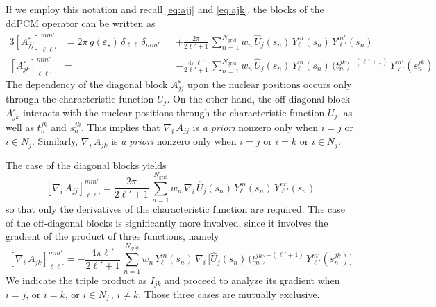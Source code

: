 \documentclass[aip,jcp,a4paper,11pt]{revtex4-1}
\newcommand{\nablai}{\nabla_{\!i}\,}
\begin{document}
If we employ this notation and recall \eqref{eq:ajj} and \eqref{eq:ajk}, the blocks of the ddPCM operator can be written as
\begin{alignat*}{3}
{[A_{jj}^\varepsilon]}_{\ell \ell'}^{mm'}& = 2\pi \, g(\varepsilon_s) \, \delta_{\ell \ell'} \delta_{m m'}&& + \frac{2\pi}{2 \ell' + 1} \,\sum_{n= 1}^{N_\text{grid}} w_n \, \hat{U}_j(s_n)  \,Y_\ell^m(s_n) \,  Y_{\ell'}^{m'}(s_n) \\
{[A_{jk}^\varepsilon]}_{\ell \ell'}^{mm'}& =&& -  \frac{4 \pi \ell'}{2 \ell'+1} \, \sum_{n= 1}^{N_\text{grid}} w_n\, \hat{U}_j(s_n) \, Y_\ell^m(s_n) \, \big( t_n^{jk}\big)^{-(\ell'+1)} \, Y_{\ell'}^{m'} (s_n^{jk})
\end{alignat*}
The dependency of the diagonal block $A_{jj}^\varepsilon$ upon the nuclear positions occurs only through the characteristic function $U_j$. On the other hand, the off-diagonal block $A_{jk}^\varepsilon$ interacts with the nuclear positions through the characteristic function $U_j$, as well as $t_n^{jk}$ and $s_n^{jk}$. This implies that $\nablai A_{jj}$ is \emph{a priori} nonzero only when $i = j$ or $i \in N_j$. Similarly, $\nablai A_{jk}$ is \emph{a priori} nonzero only when $i = j$ or $i = k$ or $i \in N_j$.


The case of the diagonal blocks yields
\[
{[\nablai A_{jj}]}_{\ell \ell'}^{mm'} = \frac{2\pi}{2 \ell' + 1} \,\sum_{n=1}^{N_\text{grid}} w_n \, \nablai \hat{U}_j(s_n)  \,Y_\ell^m(s_n) \,  Y_{\ell'}^{m'}(s_n)
\]
so that only the derivatives of the characteristic function are required. The case of the off-diagonal blocks is significantly more involved, since it involves the gradient of the product of three functions, namely
\begin{equation}\label{eq:7}
{[\nablai A_{jk}]}_{\ell \ell'}^{mm'} = -  \frac{4 \pi \ell'}{2 \ell'+1} \, \sum_{n = 1}^{N_\text{grid}} w_n\, Y_\ell^m(s_n) \,\nablai \Big[ \hat{U}_j(s_n)  \,  \big( t_n^{jk}\big)^{-(\ell'+1)} \, Y_{\ell'}^{m'} (s_n^{jk}) \Big]
\end{equation}
We indicate the triple product as $I_{jk}$ and proceed to analyze its gradient when $i = j$, or $i = k$, or $i \in N_j \, , \, i \not= k$. Those three cases are mutually exclusive.
\end{document}
